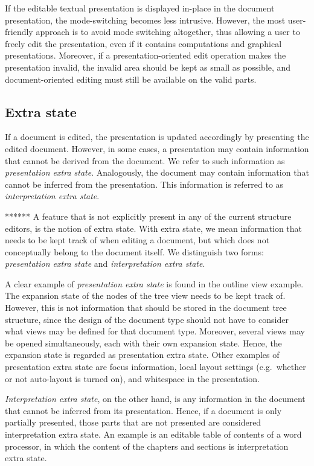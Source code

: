 If the editable textual presentation is displayed in-place in the document presentation, the mode-switching becomes less intrusive. However, the most user-friendly approach is to avoid mode switching altogether, thus allowing a user to freely edit the presentation, even if it contains computations and graphical presentations. Moreover, if a presentation-oriented edit operation makes the presentation invalid, the invalid area should be kept as small as possible, and document-oriented editing must still be available on the valid parts.


%																
\subsection{Extra state} \label{sect:editingExtraState}

If a document is edited, the presentation is updated accordingly by presenting the edited document. However, in some cases, a presentation may contain information that cannot be derived from the document. We refer to such information as {\em presentation extra state}. Analogously, the document may contain information that cannot be inferred from the presentation. This information is referred to as {\em interpretation extra state}. 

\bc *******
A feature that is not explicitly present in any of the current structure editors, is the notion of extra state. With extra state, we mean information that needs to be kept track of when editing a document, but which does not conceptually belong to the document itself.  We distinguish two forms: {\em presentation extra state} and {\em interpretation extra state}.
\ec

A clear example of {\em presentation extra state} is found in the outline view example. The expansion state of the nodes of the tree view needs to be kept track of. However, this is not information that should be stored in the document tree structure, since the design of the document type should not have to consider what views may be defined for that document type. Moreover, several views may be opened simultaneously, each with their own expansion state. Hence, the expansion state is regarded as presentation extra state. Other examples of presentation extra state are focus information, local layout settings (e.g.\ whether or not auto-layout is turned on), and whitespace in the presentation. 

{\em Interpretation extra state}, on the other hand, is any information in the document that cannot be inferred from its presentation. Hence, if a document is only partially presented, those parts that are not presented are considered interpretation extra state. An example is an editable table of contents of a word processor, in which the content of the chapters and sections is interpretation extra state.

